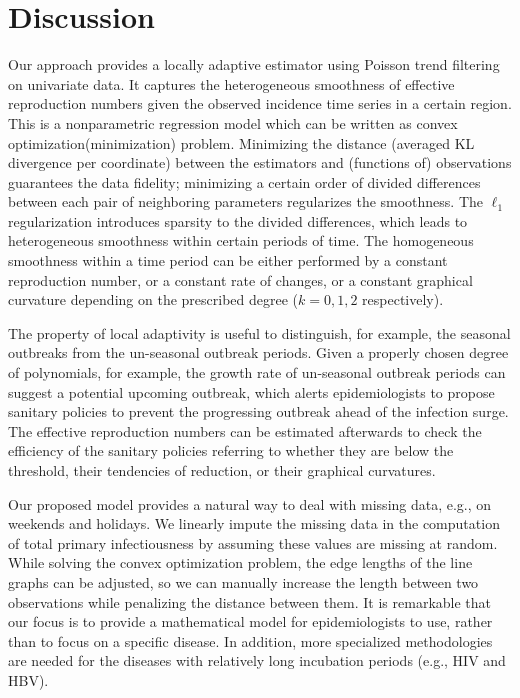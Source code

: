 \section{Discussion}

Our approach provides a locally adaptive estimator using Poisson trend filtering on univariate data. It captures the heterogeneous smoothness of effective reproduction numbers given the observed incidence time series in a certain region. This is a nonparametric regression model which can be written as convex optimization(minimization) problem. Minimizing the distance (averaged KL divergence per coordinate) between the estimators and (functions of) observations guarantees the data fidelity; minimizing a certain order of divided differences between each pair of neighboring parameters regularizes the smoothness. The $\ell_1$ regularization introduces sparsity to the divided differences, which leads to heterogeneous smoothness within certain periods of time. The homogeneous smoothness within a time period can be either performed by a constant reproduction number, or a constant rate of changes, or a constant graphical curvature depending on the prescribed degree ($k=0,1,2$ respectively). %

The property of local adaptivity is useful to distinguish, for example, the seasonal outbreaks from the un-seasonal outbreak periods. Given a properly chosen degree of polynomials, for example, the growth rate of un-seasonal outbreak periods can suggest a potential upcoming outbreak, which alerts epidemiologists to propose sanitary policies to prevent the progressing outbreak ahead of the infection surge. The effective reproduction numbers can be estimated afterwards to check the efficiency of the sanitary policies referring to whether they are below the threshold, their tendencies of reduction, or their graphical curvatures.

Our proposed model provides a natural way to deal with missing data, e.g., on weekends and holidays. We linearly impute the missing data in the computation of total primary infectiousness by assuming these values are missing at random. 
While solving the convex optimization problem, the edge lengths of the line graphs can be adjusted, so we can manually increase the length between two observations while penalizing the distance between them. 
It is remarkable that our focus is to provide a mathematical model for epidemiologists to use, rather than to focus on a specific disease. In addition, more specialized methodologies are needed for the diseases with relatively long incubation periods (e.g., HIV and HBV). 


